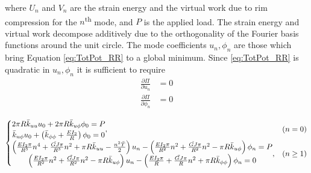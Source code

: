 \documentclass[\rootdir/thesis.tex]{subfiles}
\begin{document}
where $U_n$ and $V_n$ are the strain energy and the virtual work due to rim compression for the $n$\textsuperscript{th} mode, and $P$ is the applied load. The strain energy and virtual work decompose additively due to the orthogonality of the Fourier basis functions around the unit circle. The mode coefficients $u_n, \phi_n$ are those which bring Equation \eqref{eq:TotPot_RR} to a global minimum. Since \eqref{eq:TotPot_RR} is quadratic in $u_n, \phi_n$ it is sufficient to require
\begin{subequations}
\begin{align}
\frac{\partial \Pi}{\partial u_n} &= 0\\
\frac{\partial \Pi}{\partial \phi_n} &= 0
\end{align}
\end{subequations}

\begin{equation}
\begin{cases}
\begin{matrix}
2\pi R \bar{k}_{uu} u_0 + 2\pi R \bar{k}_{u\phi} \phi_0=P\\
\bar{k}_{u\phi} u_0 + \left(\bar{k}_{\phi\phi} + \frac{EI_2}{R}\right)\phi_0=0
\end{matrix}, & (n=0)\\
\begin{matrix}
\left(\frac{EI_2\pi}{R^3}n^4 + \frac{\tilde{GJ}\pi}{R^3}n^2 + \pi R\bar{k}_{uu} -\frac{n^2\bar{T}}{2}\right)u_n
	-\left(\frac{EI_2\pi}{R^2}n^2 + \frac{\tilde{GJ}\pi}{R^2}n^2-\pi R\bar{k}_{u\phi}\right)\phi_n =P\\
\left(\frac{EI_2\pi}{R^2}n^2 + \frac{\tilde{GJ}\pi}{R^2}n^2 - \pi R\bar{k}_{u\phi} \right)u_n
 - \left(\frac{EI_2\pi}{R} + \frac{\tilde{GJ}\pi}{R}n^2 + \pi R\bar{k}_{\phi\phi}\right)\phi_n =0
\end{matrix}, & (n\geq 1)
\end{cases}
\end{equation}
\end{document}
